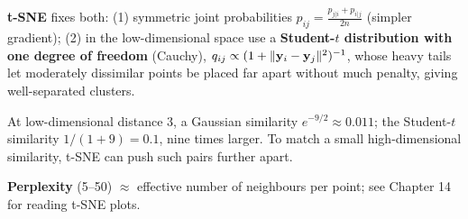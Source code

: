 \textbf{t-SNE} fixes both: (1) symmetric joint probabilities $p_{ij} = \frac{p_{j|i} + p_{i|j}}{2n}$ (simpler gradient); (2) in the low-dimensional space use a
\textbf{Student-$t$ distribution with one degree of freedom} (Cauchy), $q_{ij}\propto(1 + \lVert \mathbf y_i - \mathbf y_j\rVert^2)^{-1}$, whose heavy tails let moderately
dissimilar points be placed far apart without much penalty, giving well-separated clusters.
\begin{example}
At low-dimensional distance 3, a Gaussian similarity $e^{-9/2}\approx0.011$; the Student-$t$ similarity $1/(1 + 9) = 0.1$, nine times larger. To match a small
high-dimensional similarity, t-SNE can push such pairs further apart.
\end{example}
\textbf{Perplexity} (5--50) $\approx$ effective number of neighbours per point; see Chapter 14 for reading t-SNE plots.

